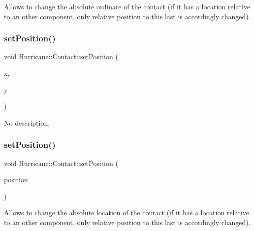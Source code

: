 Allows to change the absolute ordinate of the contact (if it has a location relative to an other component, only relative position to this last is accordingly changed). \mbox{\label{classHurricane_1_1Contact_ae44d4d7655428705f13dca34c7167690}} 
\subsubsection{\texorpdfstring{set\+Position()}{setPosition()}\hspace{0.1cm}{\footnotesize\ttfamily [1/2]}}
{\footnotesize\ttfamily void Hurricane\+::\+Contact\+::set\+Position (\begin{DoxyParamCaption}\item[{\mbox{\hyperlink{group__DbUGroup_ga4fbfa3e8c89347af76c9628ea06c4146}{Db\+U\+::\+Unit}}}]{x,  }\item[{\mbox{\hyperlink{group__DbUGroup_ga4fbfa3e8c89347af76c9628ea06c4146}{Db\+U\+::\+Unit}}}]{y }\end{DoxyParamCaption})}

No description. \mbox{\label{classHurricane_1_1Contact_aedcc63fe54538939c03fe81a16b0bae0}} 
\subsubsection{\texorpdfstring{set\+Position()}{setPosition()}\hspace{0.1cm}{\footnotesize\ttfamily [2/2]}}
{\footnotesize\ttfamily void Hurricane\+::\+Contact\+::set\+Position (\begin{DoxyParamCaption}\item[{const \mbox{\hyperlink{classHurricane_1_1Point}{Point}} \&}]{position }\end{DoxyParamCaption})}

Allows to change the absolute location of the contact (if it has a location relative to an other component, only relative position to this last is accordingly changed). \mbox{\label{classHurricane_1_1Contact_a82f29c6b48b0c5a51fe3c1678d71876c}} 
